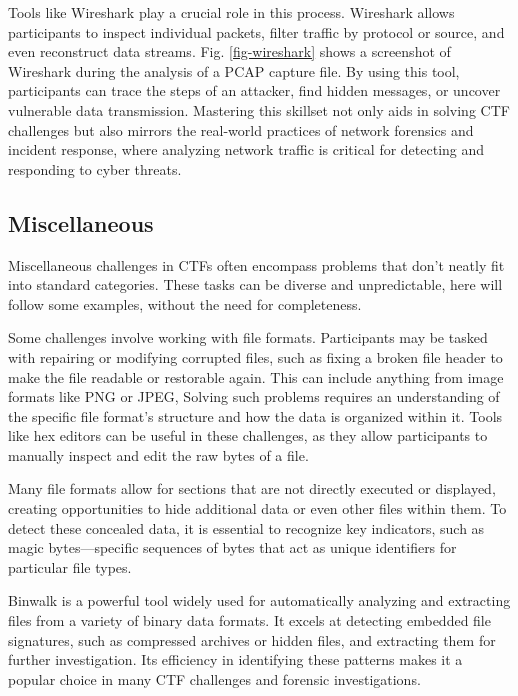 \documentclass[conference]{IEEEtran}
\begin{document}
Tools like Wireshark
\cite{ndatinya2015}
play a crucial role in this process. Wireshark allows
participants to inspect individual packets, filter traffic by protocol or
source, and even reconstruct data streams.
Fig. \ref{fig-wireshark} shows a screenshot of Wireshark during the analysis of
a PCAP capture file.
By using this tool, participants can
trace the steps of an attacker, find hidden messages, or uncover vulnerable
data transmission. Mastering this skillset not only aids in solving CTF
challenges but also mirrors the real-world practices of network forensics and
incident response, where analyzing network traffic is critical for detecting
and responding to cyber threats.

\subsection{Miscellaneous}

Miscellaneous challenges in CTFs often encompass problems that don't neatly fit
into standard categories.
These tasks can be diverse and unpredictable, here will follow some examples, without
the need for completeness. 

Some challenges involve
working with file formats. Participants may be tasked with repairing or
modifying corrupted files, such as fixing a broken file header to make the file
readable or restorable again. This can include anything from image formats like
PNG or JPEG, 
Solving such problems requires an understanding of the specific file format’s
structure and how the data is organized within it. Tools like hex editors can
be useful in these challenges, as they allow participants to manually inspect
and edit the raw bytes of a file.

Many file formats allow for sections that are not directly executed or
displayed, creating opportunities to hide additional data or even other files
within them. To detect these concealed data,
it is essential to recognize key indicators, such as magic bytes—specific
sequences of bytes that act as unique identifiers for particular file types.

Binwalk is a powerful tool widely used for automatically analyzing and
extracting files from a variety of binary data formats. It excels at detecting
embedded file signatures, such as compressed archives or hidden files, and
extracting them for further investigation. Its efficiency in identifying these
patterns makes it a popular choice in many CTF challenges and forensic
investigations.
\end{document}
